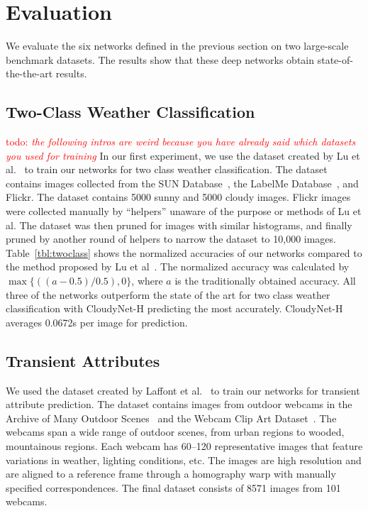 \documentclass[10pt,twocolumn,letterpaper]{article}
\newcommand{\todo}[1]{\textcolor{red}{todo: {\em #1}}}
\newcommand{\tblref}[1]{Table~\ref{tbl:#1}}
\begin{document}
\section{Evaluation}
We evaluate the six networks defined in the previous section on two large-scale
benchmark datasets. The results show that these deep networks obtain
state-of-the-the-art results. 


\subsection{Two-Class Weather Classification}
\todo{the following intros are weird because you have already said which
datasets you used for training}
In our first experiment, we use the dataset created by Lu et
al.~\cite{lutwoclass} to train our networks for two class weather
classification.  The dataset contains images collected from the SUN
Database~\cite{xiaoSUN}, the LabelMe Database~\cite{russell2008labelme}, and
Flickr. The dataset contains 5000 sunny and 5000 cloudy images. Flickr images
were collected manually by ``helpers'' unaware of the purpose or methods of Lu
et al. The dataset was then pruned for images with similar histograms, and
finally pruned by another round of helpers to narrow the dataset to 10,000
images.  \tblref{twoclass} shows the normalized accuracies of our networks
compared to the method proposed by Lu et al~\cite{lutwoclass}.  The normalized
accuracy was calculated by $ \max\{((a - 0.5) / 0.5), 0\} $, where $a$ is the
traditionally obtained accuracy. All three of the networks outperform the state
of the art for two class weather classification with CloudyNet-H predicting the
most accurately.  CloudyNet-H averages 0.0672s per image for prediction. 

\subsection{Transient Attributes}
We used the dataset created by Laffont et al.~\cite{Laffont14} to train our
networks for transient attribute prediction. The dataset contains images from
outdoor webcams in the Archive of Many Outdoor Scenes~\cite{jacobs07amos} and
the Webcam Clip Art Dataset~\cite{lalondesig09}.  The webcams span a wide range
of outdoor scenes, from urban regions to wooded, mountainous regions. Each
webcam has 60--120 representative images that feature variations in weather,
lighting conditions, etc.  The images are high resolution and are aligned to a
reference frame through a homography warp with manually specified
correspondences.  The final dataset consists of 8571 images from 101 webcams.
\end{document}
